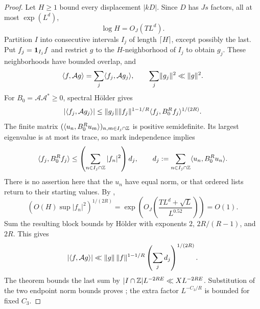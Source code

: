 \begin{proof}
Let $H\ge1$ bound every displacement $|kD|$.  Since
$D$ has $Js$ factors, all at most $\exp(L^d)$,
\begin{equation}\label{eq:maximum-graph-step}
 \log H=O_J(TL^d).
\end{equation}
Partition $I$ into consecutive intervals $I_j$ of
length $\lceil H\rceil$, except possibly the last.
Put $f_j=\mathbf 1_{I_j}f$ and restrict $g$ to the
$H$-neighborhood of $I_j$ to obtain $g_j$.  These
neighborhoods have bounded overlap, and
\[
 \langle f,\mathcal A g\rangle
       =\sum_j\langle f_j,\mathcal A g_j\rangle,
 \qquad \sum_j\lVert g_j\rVert^2\ll\lVert g\rVert^2.
\]
For $B_0=\mathcal A\mathcal A^*\ge0$, spectral
H\"older gives
\[
 |\langle f_j,\mathcal A g_j\rangle|
 \le\lVert g_j\rVert\lVert f_j\rVert^{1-1/R}
       \langle f_j,B_0^Rf_j\rangle^{1/(2R)}.
\]
The finite matrix
$(\langle u_n,B_0^Ru_m\rangle)_{n,m\in I_j\cap\mathbb Z}$
is positive semidefinite.  Its largest eigenvalue is
at most its trace, so mark independence implies
\[
 \langle f_j,B_0^Rf_j\rangle
 \le\left(\sum_{n\in I_j\cap\mathbb Z}|f_n|^2\right)d_j,
 \qquad
 d_j:=\sum_{n\in I_j\cap\mathbb Z}
                  \langle u_n,B_0^Ru_n\rangle.
\]
There is no assertion here that the $u_n$ have equal
norm, or that ordered lists return to their starting
values.  By ,
\[
 \left(O(H)\sup|f_n|^2\right)^{1/(2R)}
 =\exp\left(O_J\left(\frac{TL^d+\sqrt L}{L^{0.52}}\right)\right)
 =O(1).
\]
Sum the resulting block bounds by H\"older with
exponents $2$, $2R/(R-1)$, and $2R$.  This gives
\[
 |\langle f,\mathcal A g\rangle|
 \ll\lVert g\rVert\,\lVert f\rVert^{1-1/R}
                       \left(\sum_jd_j\right)^{1/(2R)}.
\]
The theorem bounds the last sum by
$|I\cap\mathbb Z|L^{-2RE}\ll XL^{-2RE}$.
Substitution of the two endpoint norm bounds proves
; the extra factor
$L^{-C_3/R}$ is bounded for fixed $C_3$.
\end{proof}
